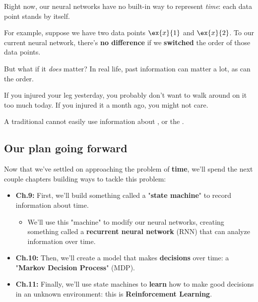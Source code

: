         Right now, our neural networks have no built-in way to represent \textit{time}: each data point stands by itself.
            
        For example, suppose we have two data points $\ex{x}{1}$ and $\ex{x}{2}$. To our current neural network, there's \textbf{no difference} if we \textbf{switched} the order of those data points.
        
        But what if it \textit{does} matter? In real life, past information can matter a lot, as can the order.
        
        \miniex If you injured your leg yesterday, you probably don't want to walk around on it too much today. If you injured it a month ago, you might not care.\\
        
        \begin{concept}
            A traditional  cannot easily use information about , or the .
        \end{concept}
        
    \secdiv
        
    \subsection{Our plan going forward}
        
        Now that we've settled on approaching the problem of \textbf{time}, we'll spend the next couple chapters building ways to tackle this problem:
        
        \begin{itemize}
            \item \textbf{Ch.9:} First, we'll build something called a "\textbf{state machine}" to record information about time.
                \begin{itemize}
                    \item We'll use this "machine" to modify our neural networks, creating something called a \textbf{recurrent neural network} (RNN) that can analyze information over time.
                \end{itemize}
            
            \item \textbf{Ch.10:} Then, we'll create a model that makes \textbf{decisions} over time: a "\textbf{Markov Decision Process}" (MDP).
            
            \item \textbf{Ch.11:} Finally, we'll use state machines to \textbf{learn} how to make good decisions in an unknown environment: this is \textbf{Reinforcement Learning}.
        \end{itemize}

